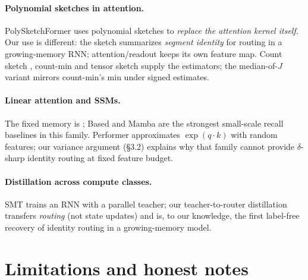 \documentclass[11pt]{article}
\begin{document}
\paragraph{Polynomial sketches in attention.} PolySketchFormer
\citep{kacham2023polysketchformer} uses polynomial sketches to \emph{replace the
attention kernel itself}. Our use is different: the sketch summarizes
\emph{segment identity} for routing in a growing-memory RNN; attention/readout
keeps its own feature map. Count sketch \citep{charikar2002countsketch}, count-min
\citep{cormode2005countmin} and tensor sketch \citep{pham2013tensorsketch} supply
the estimators; the median-of-$J$ variant mirrors count-min's min under signed
estimates.

\paragraph{Linear attention and SSMs.} The fixed memory is
\citet{katharopoulos2020linear}; Based and Mamba are the strongest small-scale
recall baselines in this family. Performer \citep{choromanski2021performer}
approximates $\exp(q\!\cdot\!k)$ with random features; our variance argument
(\S3.2) explains why that family cannot provide $\delta$-sharp identity routing at
fixed feature budget.

\paragraph{Distillation across compute classes.} SMT \citep{kumar2026smt} trains
an RNN with a parallel teacher; our teacher-to-router distillation transfers
\emph{routing} (not state updates) and is, to our knowledge, the first label-free
recovery of identity routing in a growing-memory model.

\section{Limitations and honest notes}
\end{document}
